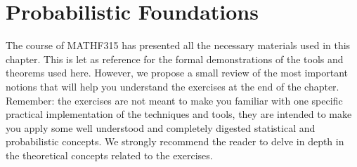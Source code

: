 \documentclass[letterpaper,10pt,english]{jupyterBook}
\begin{document}
\section{Probabilistic Foundations}
\label{\detokenize{01:probabilistic-foundations}}
\sphinxAtStartPar
The course of MATH\sphinxhyphen{}F315 \sphinxhyphen{}  has presented all the necessary materials used in this chapter. This is let as reference for the formal demonstrations of the tools and theorems used here. However, we propose a small review of the most important notions that will help you understand the exercises at the end of the chapter. Remember: the exercises are not meant to make you familiar with one specific practical implementation of the techniques and tools, they are intended to make you apply some well understood and completely digested statistical and probabilistic concepts. We strongly recommend the reader to delve in depth in the theoretical concepts related to the exercises.
\end{document}
